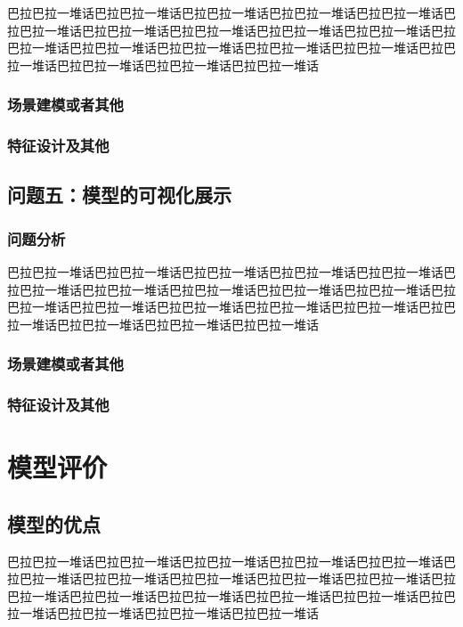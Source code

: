 \documentclass[bwprint]{gmcmthesis}
\begin{document}
巴拉巴拉一堆话巴拉巴拉一堆话巴拉巴拉一堆话巴拉巴拉一堆话巴拉巴拉一堆话巴拉巴拉一堆话巴拉巴拉一堆话巴拉巴拉一堆话巴拉巴拉一堆话巴拉巴拉一堆话巴拉巴拉一堆话巴拉巴拉一堆话巴拉巴拉一堆话巴拉巴拉一堆话巴拉巴拉一堆话巴拉巴拉一堆话巴拉巴拉一堆话巴拉巴拉一堆话巴拉巴拉一堆话
\subsubsection{场景建模或者其他}

\subsubsection{特征设计及其他}
\subsection{问题五：模型的可视化展示}
\subsubsection{问题分析}

巴拉巴拉一堆话巴拉巴拉一堆话巴拉巴拉一堆话巴拉巴拉一堆话巴拉巴拉一堆话巴拉巴拉一堆话巴拉巴拉一堆话巴拉巴拉一堆话巴拉巴拉一堆话巴拉巴拉一堆话巴拉巴拉一堆话巴拉巴拉一堆话巴拉巴拉一堆话巴拉巴拉一堆话巴拉巴拉一堆话巴拉巴拉一堆话巴拉巴拉一堆话巴拉巴拉一堆话巴拉巴拉一堆话
\subsubsection{场景建模或者其他}

\subsubsection{特征设计及其他}


\section{模型评价}


\subsection{模型的优点}
巴拉巴拉一堆话巴拉巴拉一堆话巴拉巴拉一堆话巴拉巴拉一堆话巴拉巴拉一堆话巴拉巴拉一堆话巴拉巴拉一堆话巴拉巴拉一堆话巴拉巴拉一堆话巴拉巴拉一堆话巴拉巴拉一堆话巴拉巴拉一堆话巴拉巴拉一堆话巴拉巴拉一堆话巴拉巴拉一堆话巴拉巴拉一堆话巴拉巴拉一堆话巴拉巴拉一堆话巴拉巴拉一堆话
\end{document}
